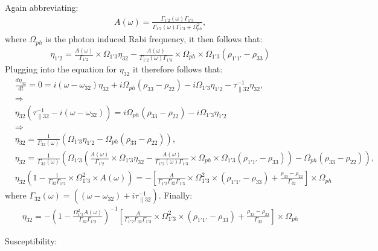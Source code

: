 \documentclass[10pt,letterpaper]{article}
\begin{document}
	Again abbreviating:
	\begin{align}
	& A(\omega) = \frac{\Gamma_{1'2}(\omega)\Gamma_{1'3}}{\Gamma_{1'2}(\omega)\Gamma_{1'3}+\Omega_{ph}^2},
	\end{align}
	where $\Omega_{ph}$ is the photon induced Rabi frequency, it then follows that:
	\begin{align}
	&\eta_{1'2}=  \frac{A(\omega)}{ \Gamma_{1'2} } \times \Omega_{1'3}\eta_{32} - \frac{A(\omega)}{\Gamma_{1'2}(\omega)\Gamma_{1'3}}\times \Omega_{ph}\times \Omega_{1'3}(\rho_{1'1'} - \rho_{33})
	\end{align}
	Plugging into the equation for $\eta_{32}$ it therefore follows that:
	\begin{align}
	&\frac{d \eta_{32}}{d t}   = 0 = i(\omega - \omega_{32})\eta_{32} +i \Omega_{ph}(\rho_{33}-\rho_{22}) - i\Omega_{1'3}\eta_{1'2} - \tau_{\parallel 32}^{-1}\eta_{32}, \\
	&\Rightarrow \nonumber \\
	&\eta_{32} (\tau_{\parallel 32}^{-1}-i(\omega - \omega_{32})) = i\Omega_{ph}(\rho_{33}-\rho_{22}) - i\Omega_{1'3}\eta_{1'2} \\ 
	&\Rightarrow \nonumber \\
	&\eta_{32} = \frac{1}{\Gamma_{32}(\omega) }  \left(\Omega_{1'3}\eta_{1'2}-\Omega_{ph}(\rho_{33}-\rho_{22}) \right), \\ 
	&\eta_{32} = \frac{1}{\Gamma_{32}(\omega) }  \left(\Omega_{1'3}\left(\frac{A(\omega)}{ \Gamma_{1'2} } \times \Omega_{1'3}\eta_{32} - \frac{A(\omega)}{\Gamma_{1'2}(\omega)\Gamma_{1'3}}\times \Omega_{ph}\times \Omega_{1'3}(\rho_{1'1'} - \rho_{33})\right)-\Omega_{ph}(\rho_{33}-\rho_{22}) \right), \\ 
	&\eta_{32}(1-\frac{1}{\Gamma_{32}\Gamma_{1'2}}\times\Omega_{1'3}^2 \times A(\omega)) = -\left [ \frac{A}{\Gamma_{1'2}\Gamma_{32}\Gamma_{1'3}}\times \Omega_{1'3}^2\times(\rho_{1'1'}-\rho_{33}) +\frac{\rho_{33}-\rho_{22}}{\Gamma_{32}} \right]\times\Omega_{ph}
	\end{align}
	where $  \Gamma_{32}(\omega) = ((\omega - \omega_{32})+i\tau_{\parallel 32}^{-1}). $ Finally:
	\begin{align}
	&\eta_{32} =-(1-\frac{\Omega_{1'3}^2  A(\omega)}{\Gamma_{32}\Gamma_{1'2}})^{-1} \left [ \frac{A}{\Gamma_{1'2}\Gamma_{32}\Gamma_{1'3}}\times \Omega_{1'3}^2\times(\rho_{1'1'}-\rho_{33}) +\frac{\rho_{33}-\rho_{22}}{\Gamma_{32}} \right]\times\Omega_{ph}
	\end{align}
	
	Susceptibility:
	
\end{document}
